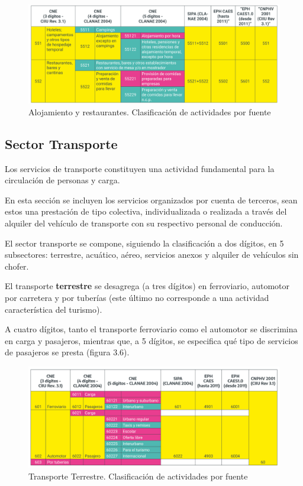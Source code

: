 \documentclass[
  openany]{book}
\begin{document}
\begin{figure}

{\centering \includegraphics[width=1\linewidth]{imagenes/figura3.5} 

}

\caption{Alojamiento y restaurantes. Clasificación de actividades por fuente}\label{fig:empleofuentes5}
\end{figure}

\hypertarget{sector-transporte}{%
\subsection{Sector Transporte}\label{sector-transporte}}

Los servicios de transporte constituyen una actividad fundamental para la circulación de personas y carga.

En esta sección se incluyen los servicios organizados por cuenta de terceros, sean estos una prestación de tipo colectiva, individualizada o realizada a través del alquiler del vehículo de transporte con su respectivo personal de conducción.

El sector transporte se compone, siguiendo la clasificación a dos dígitos, en 5 subsectores: terrestre, acuático, aéreo, servicios anexos y alquiler de vehículos sin chofer.

El transporte \textbf{terrestre} se desagrega (a tres dígitos) en ferroviario, automotor por carretera y por tuberías (este último no corresponde a una actividad característica del turismo).

A cuatro dígitos, tanto el transporte ferroviario como el automotor se discrimina en carga y pasajeros, mientras que, a 5 dígitos, se especifica qué tipo de servicios de pasajeros se presta (figura 3.6).

\begin{figure}

{\centering \includegraphics[width=1\linewidth]{imagenes/figura3.6} 

}

\caption{Transporte Terrestre. Clasificación de actividades por fuente}\label{fig:empleofuentes6}
\end{figure}
\end{document}
